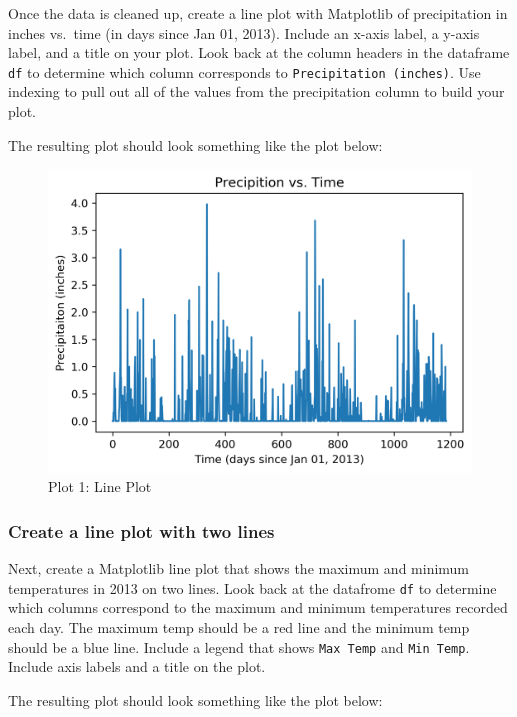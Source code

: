 \documentclass[11pt]{article}
\makeatletter
\def\maxwidth{\ifdim\Gin@nat@width>\linewidth\linewidth
    \else\Gin@nat@width\fi}
\let\Oldincludegraphics\includegraphics
\renewcommand{\includegraphics}[1]{\Oldincludegraphics[width=.8\maxwidth]{#1}}
\makeatother
\begin{document}
Once the data is cleaned up, create a line plot with Matplotlib of
precipitation in inches vs.~time (in days since Jan 01, 2013). Include
an x-axis label, a y-axis label, and a title on your plot. Look back at
the column headers in the dataframe \texttt{df} to determine which
column corresponds to \texttt{Precipitation\ (inches)}. Use indexing to
pull out all of the values from the precipitation column to build your
plot.

The resulting plot should look something like the plot below:

\begin{figure}[h!]
\centering
\includegraphics{images/plot1.png}
\caption{Plot 1: Line Plot}
\end{figure}
\newpage
    \hypertarget{create-a-line-plot-with-two-lines}{%
\subsubsection{Create a line plot with two
lines}\label{create-a-line-plot-with-two-lines}}

Next, create a Matplotlib line plot that shows the maximum and minimum
temperatures in 2013 on two lines. Look back at the datafrome
\texttt{df} to determine which columns correspond to the maximum and
minimum temperatures recorded each day. The maximum temp should be a red
line and the minimum temp should be a blue line. Include a legend that
shows \texttt{Max\ Temp} and \texttt{Min\ Temp}. Include axis labels and
a title on the plot.

The resulting plot should look something like the plot below:
\end{document}
